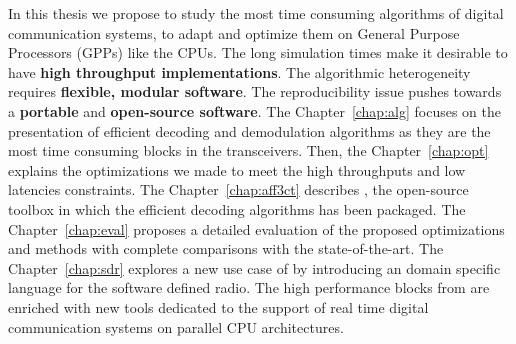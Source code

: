 In this thesis we propose to study the most time consuming algorithms of digital
communication systems, to adapt and optimize them on General Purpose Processors
(GPPs) like the CPUs. The long simulation times make it desirable to have
\textbf{high throughput implementations}. The algorithmic heterogeneity requires
\textbf{flexible, modular software}. The reproducibility issue pushes towards a
\textbf{portable} and \textbf{open-source software}. The Chapter~\ref{chap:alg}
focuses on the presentation of efficient decoding and demodulation algorithms as
they are the most time consuming blocks in the transceivers. Then, the
Chapter~\ref{chap:opt} explains the optimizations we made to meet the high
throughputs and low latencies constraints. The Chapter~\ref{chap:aff3ct}
describes \AFFECT, the open-source toolbox in which the efficient decoding
algorithms has been packaged. The Chapter~\ref{chap:eval} proposes a detailed
evaluation of the proposed optimizations and methods with complete comparisons
with the state-of-the-art. The Chapter~\ref{chap:sdr} explores a new use case
of \AFFECT by introducing an domain specific language for the software defined
radio. The high performance blocks from \AFFECT are enriched with new tools
dedicated to the support of real time digital communication systems on parallel
CPU architectures.